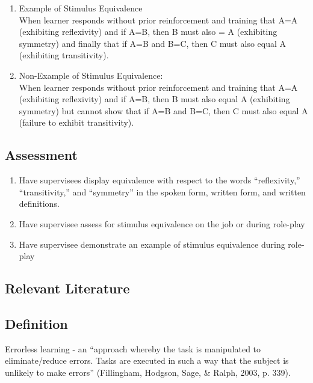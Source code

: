 \begin{enumerate}
\item Example of Stimulus Equivalence\\
When learner responds without prior reinforcement and training that A=A (exhibiting reflexivity) and if A=B, then B must also = A (exhibiting symmetry) and finally that if A=B and B=C, then C must also equal A (exhibiting transitivity). 

\item Non-Example of Stimulus Equivalence:\\
 When learner responds without prior reinforcement and training that A=A (exhibiting reflexivity) and if A=B, then B must also equal A (exhibiting symmetry) but cannot show that if A=B and B=C, then C must also equal A (failure to exhibit transitivity). 
%
\end{enumerate}
%
\subsection{Assessment}
\begin{enumerate}
\item Have supervisees display equivalence with respect to the words ``reflexivity,'' ``transitivity,'' and ``symmetry'' in the spoken form, written form, and written definitions.
\item Have supervisee assess for stimulus equivalence on the job or during role-play 
\item Have supervisee demonstrate an example of stimulus equivalence during role-play
%
\end{enumerate}
%
\subsection{Relevant Literature}
\begin{refsection}
\nocite{cooper2007applied,
        sidman1997equivalence,
        sidman2009equivalence}
\printbibliography[heading=none]
\end{refsection}
%
\subsection{Definition}
Errorless learning - an ``approach whereby the task is manipulated to eliminate/reduce errors. Tasks are executed in such a way that the subject is unlikely to make errors'' (Fillingham, Hodgson, Sage, \& Ralph, 2003, p. 339). 


